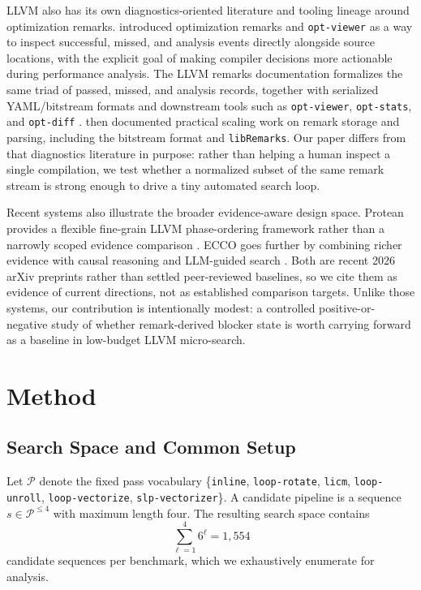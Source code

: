 \documentclass{article}
\newcommand{\passes}{\{\texttt{inline}, \texttt{loop-rotate}, \texttt{licm}, \texttt{loop-unroll}, \texttt{loop-vectorize}, \texttt{slp-vectorizer}\}}
\begin{document}
LLVM also has its own diagnostics-oriented literature and tooling lineage around optimization remarks. \citet{nemet2016compilerassisted} introduced optimization remarks and \texttt{opt-viewer} as a way to inspect successful, missed, and analysis events directly alongside source locations, with the explicit goal of making compiler decisions more actionable during performance analysis. The LLVM remarks documentation formalizes the same triad of passed, missed, and analysis records, together with serialized YAML/bitstream formats and downstream tools such as \texttt{opt-viewer}, \texttt{opt-stats}, and \texttt{opt-diff} \citep{llvmremarksdocs}. \citet{mistrih2019remarksupdate} then documented practical scaling work on remark storage and parsing, including the bitstream format and \texttt{libRemarks}. Our paper differs from that diagnostics literature in purpose: rather than helping a human inspect a single compilation, we test whether a normalized subset of the same remark stream is strong enough to drive a tiny automated search loop.

Recent systems also illustrate the broader evidence-aware design space. Protean provides a flexible fine-grain LLVM phase-ordering framework rather than a narrowly scoped evidence comparison \citep{ashouri2026protean}. ECCO goes further by combining richer evidence with causal reasoning and LLM-guided search \citep{pan2026ecco}. Both are recent 2026 arXiv preprints rather than settled peer-reviewed baselines, so we cite them as evidence of current directions, not as established comparison targets. Unlike those systems, our contribution is intentionally modest: a controlled positive-or-negative study of whether remark-derived blocker state is worth carrying forward as a baseline in low-budget LLVM micro-search.

\section{Method}
\label{sec:method}

\subsection{Search Space and Common Setup}

Let $\mathcal{P}$ denote the fixed pass vocabulary \passes. A candidate pipeline is a sequence $s \in \mathcal{P}^{\le 4}$ with maximum length four. The resulting search space contains
\[
\sum_{\ell=1}^{4} 6^\ell = 1{,}554
\]
candidate sequences per benchmark, which we exhaustively enumerate for analysis.
\end{document}
